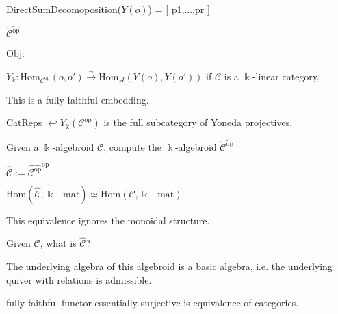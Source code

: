 DirectSumDecomoposition($Y(o)$) = [ p1,...,pr ]

$\widehat{\mathcal{C}^{\mathrm{op}}}$

$\mathrm{Obj}$: 

$Y_{\Bbbk} : \mathrm{Hom}_{\mathcal{C}^{\mathrm{op}}}(o,o') \xrightarrow{\sim} \mathrm{Hom}_\mathcal{A} (Y(o),Y(o'))$ if $\mathcal{C}$ is a $\Bbbk$-linear category.

This is a fully faithful embedding.

CatReps $\hookleftarrow Y_{\Bbbk}(\mathcal{C}^{\mathrm{op}})$ is the full subcategory of Yoneda projectives.

Given a $\Bbbk$-algebroid $\mathcal{C}$, compute the $\Bbbk$-algebroid $\widehat{\mathcal{C}^{\mathrm{op}}}$ 

$\widehat{\mathcal{C}} := \widehat{\mathcal{C}^{\mathrm{op}}}^{\mathrm{op}}$

$\mathrm{Hom}(\widehat{\mathcal{C}},\Bbbk\mathrm{-mat}) \simeq \mathrm{Hom}(\mathcal{C},\Bbbk\mathrm{-mat})$

This equivalence ignores the monoidal structure.

Given $\mathcal{C}$, what is $\widehat{\mathcal{C}}$?

The underlying algebra of this algebroid is a basic algebra, i.e. the underlying quiver with relations is admissible.

fully-faithful functor essentially surjective is equivalence of categories.